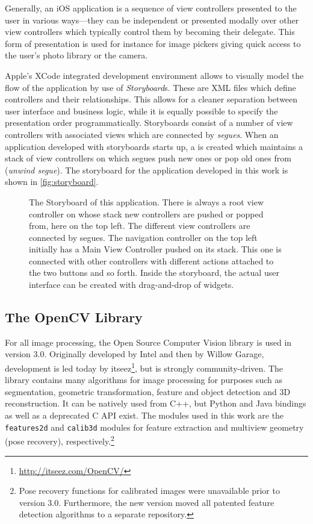 Generally, an iOS application is a sequence of view controllers presented to the
user in various ways---they can be independent or presented modally over other
view controllers which typically control them by becoming their delegate. This
form of presentation is used for instance for image pickers giving quick access
to the user's photo library or the camera.

Apple's XCode integrated development environment allows to visually model the
flow of the application by use of \emph{Storyboard}s. These are XML files which
define controllers and their relationships.  This allows for a cleaner
separation between user interface and business logic, while it is equally
possible to specify the presentation order programmatically.  Storyboards
consist of a number of view controllers with associated views which are
connected by \emph{segues}. When an application developed with storyboards
starts up, a  is created which maintains a stack of
view controllers on which segues push new ones or pop old ones from (\emph{unwind
segue}). The storyboard for the application developed in this work is shown in
\autoref{fig:storyboard}.

\begin{figure}[h]
   {\centering      
      
      \caption[Storyboard example]{The Storyboard of this application. There is
      always a root view controller on whose stack new controllers are pushed or
   popped from, here on the top left. The different view controllers are
connected by segues. The navigation controller on the top left initially has a
Main View Controller pushed on its stack. This one is connected with other
controllers with different actions attached to the two buttons and so forth.
Inside the storyboard, the actual user interface can be created with
drag-and-drop of widgets.}
   \label{fig:storyboard}}
\end{figure}

\FloatBarrier

\subsection{The OpenCV Library}

For all image processing, the Open Source Computer Vision library \citep{opencv} is
used in version 3.0. Originally developed by Intel and then by Willow Garage,
development is led today by itseez\footnote{\url{http://itseez.com/OpenCV/}},
but is strongly community-driven. The library contains many algorithms for image
processing for purposes such as segmentation, geometric transformation, feature
and object detection and 3D reconstruction. It can be natively used from C++,
but Python and Java bindings as well as a deprecated C API exist.  The modules
used in this work are the \texttt{features2d} and \texttt{calib3d} modules for
feature extraction and multiview geometry (pose recovery), respectively.\footnote{Pose recovery
   functions for calibrated images were unavailable prior to version 3.0.
Furthermore, the new version moved all patented feature detection algorithms to a separate
repository.}

